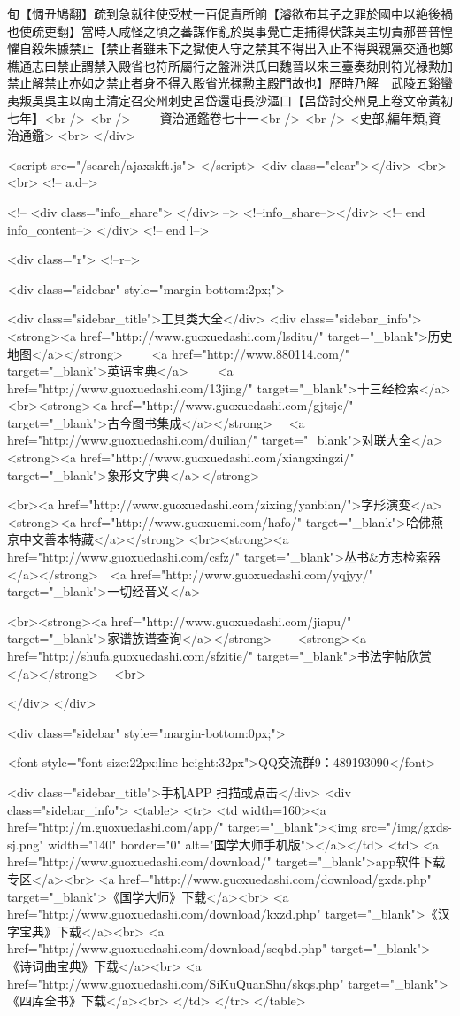 旬【惆丑鳩翻】疏到急就往使受杖一百促責所餉【濬欲布其子之罪於國中以絶後禍也使疏吏翻】當時人咸怪之頃之蕃謀作亂於吳事覺亡走捕得伏誅吳主切責郝普普惶懼自殺朱據禁止【禁止者雖未下之獄使人守之禁其不得出入止不得與親黨交通也鄭樵通志曰禁止謂禁入殿省也符所屬行之盤洲洪氏曰魏晉以來三臺奏劾則符光禄勲加禁止解禁止亦如之禁止者身不得入殿省光禄勲主殿門故也】歷時乃解　武陵五谿蠻夷叛吳吳主以南土清定召交州刺史呂岱還屯長沙漚口【呂岱討交州見上卷文帝黃初七年】<br />
<br />
　　資治通鑑卷七十一<br />
<br />
<史部,編年類,資治通鑑>  <br>
   </div> 

<script src="/search/ajaxskft.js"> </script>
 <div class="clear"></div>
<br>
<br>
 <!-- a.d-->

 <!--
<div class="info_share">
</div> 
-->
 <!--info_share--></div>   <!-- end info_content-->
  </div> <!-- end l-->

<div class="r">   <!--r-->



<div class="sidebar"  style="margin-bottom:2px;">

 
<div class="sidebar_title">工具类大全</div>
<div class="sidebar_info">
<strong><a href="http://www.guoxuedashi.com/lsditu/" target="_blank">历史地图</a></strong>　　
<a href="http://www.880114.com/" target="_blank">英语宝典</a>　　
<a href="http://www.guoxuedashi.com/13jing/" target="_blank">十三经检索</a>　
<br><strong><a href="http://www.guoxuedashi.com/gjtsjc/" target="_blank">古今图书集成</a></strong>　
<a href="http://www.guoxuedashi.com/duilian/" target="_blank">对联大全</a>　<strong><a href="http://www.guoxuedashi.com/xiangxingzi/" target="_blank">象形文字典</a></strong>　

<br><a href="http://www.guoxuedashi.com/zixing/yanbian/">字形演变</a>　　<strong><a href="http://www.guoxuemi.com/hafo/" target="_blank">哈佛燕京中文善本特藏</a></strong>
<br><strong><a href="http://www.guoxuedashi.com/csfz/" target="_blank">丛书&方志检索器</a></strong>　<a href="http://www.guoxuedashi.com/yqjyy/" target="_blank">一切经音义</a>　　

<br><strong><a href="http://www.guoxuedashi.com/jiapu/" target="_blank">家谱族谱查询</a></strong>　　<strong><a href="http://shufa.guoxuedashi.com/sfzitie/" target="_blank">书法字帖欣赏</a></strong>　
<br>

</div>
</div>


<div class="sidebar" style="margin-bottom:0px;">

<font style="font-size:22px;line-height:32px">QQ交流群9：489193090</font>


<div class="sidebar_title">手机APP 扫描或点击</div>
<div class="sidebar_info">
<table>
<tr>
	<td width=160><a href="http://m.guoxuedashi.com/app/" target="_blank"><img src="/img/gxds-sj.png" width="140"  border="0" alt="国学大师手机版"></a></td>
	<td>
<a href="http://www.guoxuedashi.com/download/" target="_blank">app软件下载专区</a><br>
<a href="http://www.guoxuedashi.com/download/gxds.php" target="_blank">《国学大师》下载</a><br>
<a href="http://www.guoxuedashi.com/download/kxzd.php" target="_blank">《汉字宝典》下载</a><br>
<a href="http://www.guoxuedashi.com/download/scqbd.php" target="_blank">《诗词曲宝典》下载</a><br>
<a href="http://www.guoxuedashi.com/SiKuQuanShu/skqs.php" target="_blank">《四库全书》下载</a><br>
</td>
</tr>
</table>

